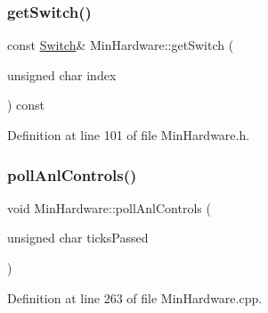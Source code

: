 \subsubsection{\texorpdfstring{get\+Switch()}{getSwitch()}\hspace{0.1cm}{\footnotesize\ttfamily [2/2]}}
{\footnotesize\ttfamily const \hyperlink{class_switch}{Switch}\& Min\+Hardware\+::get\+Switch (\begin{DoxyParamCaption}\item[{unsigned char}]{index }\end{DoxyParamCaption}) const\hspace{0.3cm}{\ttfamily [inline]}}



Definition at line 101 of file Min\+Hardware.\+h.

\mbox{\label{class_min_hardware_afa6cdaaab625ffd44c733c6ff9e29f4d}} 
\subsubsection{\texorpdfstring{poll\+Anl\+Controls()}{pollAnlControls()}}
{\footnotesize\ttfamily void Min\+Hardware\+::poll\+Anl\+Controls (\begin{DoxyParamCaption}\item[{unsigned char}]{ticks\+Passed }\end{DoxyParamCaption})}



Definition at line 263 of file Min\+Hardware.\+cpp.

